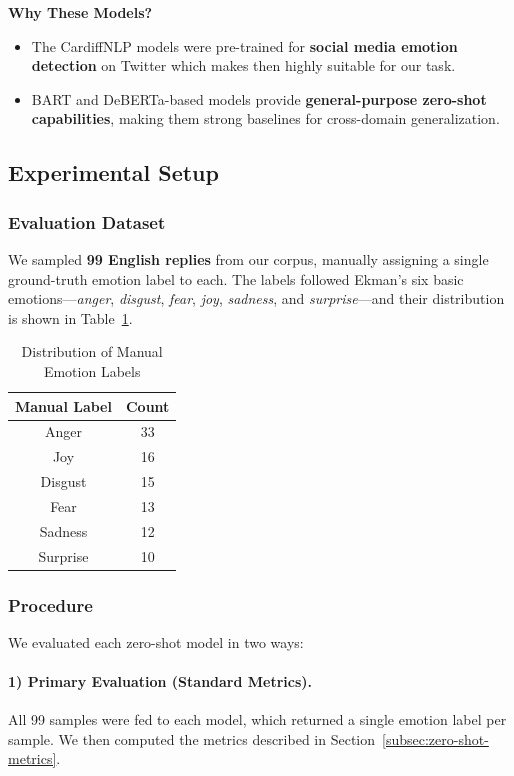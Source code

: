 \noindent \textbf{Why These Models?}
\begin{itemize}
    \item The CardiffNLP models were pre-trained for \textbf{social media emotion detection} on Twitter which makes then highly suitable for our task.
    \item BART and DeBERTa-based models provide \textbf{general-purpose zero-shot capabilities}, making them strong baselines for cross-domain generalization.
\end{itemize}

\subsection{Experimental Setup}

\subsubsection{Evaluation Dataset}
We sampled \textbf{99 English replies} from our corpus, manually assigning a single ground-truth emotion label to each. The labels followed Ekman’s six basic emotions—\textit{anger}, \textit{disgust}, \textit{fear}, \textit{joy}, \textit{sadness}, and \textit{surprise}—and their distribution is shown in Table~\ref{tab:manual_label_distribution}.

\begin{table}[ht]
    \centering
    \begin{tabular}{|c|c|}
        \hline
        \textbf{Manual Label} & \textbf{Count} \\
        \hline
        Anger     & 33 \\
        Joy       & 16 \\
        Disgust   & 15 \\
        Fear      & 13 \\
        Sadness   & 12 \\
        Surprise  & 10 \\
        \hline
    \end{tabular}
    \caption{Distribution of Manual Emotion Labels}
    \label{tab:manual_label_distribution}
\end{table}

\subsubsection{Procedure}
We evaluated each zero-shot model in two ways:

\paragraph{1) Primary Evaluation (Standard Metrics).}
All 99 samples were fed to each model, which returned a single emotion label per sample. We then computed the metrics described in Section~\ref{subsec:zero-shot-metrics}.

